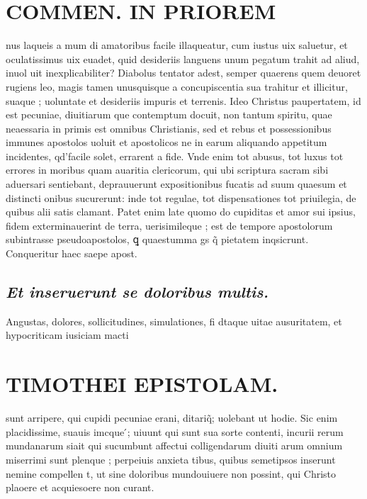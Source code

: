 \documentclass{article}
\begin{document}
\begin{pages}
\section*{COMMEN. IN PRIOREM }
\marginpar{[ p.166 ]}\pstart nus laqueis a mum di amatoribus facile illaqueatur, cum iustus uix saluetur, et oculatissimus uix euadet, quid desideriis languens unum pegatum trahit ad aliud, inuol uit inexplicabiliter? Diabolus tentator adest, semper quaerens quem deuoret rugiens leo, magis tamen unusquisque a concupiscentia sua trahitur et illicitur, suaque ; uoluntate et desideriis impuris et terrenis. Ideo Christus paupertatem, id est pecuniae, diuitiarum que contemptum docuit, non tantum spiritu, quae neaessaria in primis est omnibus Christianis, sed et rebus et possessionibus immunes apostolos uoluit et apostolicos ne in earum aliquando appetitum incidentes, qd'facile solet, errarent a fide. Vnde enim tot abusus, tot luxus tot errores in moribus quam auaritia clericorum, qui ubi scriptura sacram sibi aduersari sentiebant, deprauuerunt expositionibus fucatis ad suum quaesum et distincti onibus sucurerunt: inde tot regulae, tot dispensationes tot priuilegia, de quibus alii satis clamant. Patet enim late quomo do cupiditas et amor sui ipsius, fidem exterminauerint de terra, uerisimileque ; est de tempore apostolorum subintrasse pseudoapostolos, ꝗ quaestumma gs q̃ pietatem inqsicrunt. Conqueritur haec saepe apost.  \pend
{}
{}
\subsection*{\textit{Et inseruerunt se doloribus multis. }}\pstart Angustas, dolores, sollicitudines, simulationes, fi dtaque uitae ausuritatem, et hypocriticam iusiciam macti  \pend
\section*{TIMOTHEI EPISTOLAM. }
\marginpar{[ p.167 ]}\pstart sunt arripere, qui cupidi pecuniae erani, ditariq̃; uolebant ut hodie. Sic enim placidissime, suauis imcque ́; uiuunt qui sunt sua sorte contenti, incurii rerum mundanarum siait qui sucumbunt affectui colligendarum diuiti arum omnium miserrimi sunt plenque ; perpeiuis anxieta tibus, quibus semetipsos inserunt nemine compellen t, ut sine doloribus mundouiuere non possint, qui Christo plaoere et acquiesoere non curant.  \pend
{}
{}

\end{pages}
\end{document}
